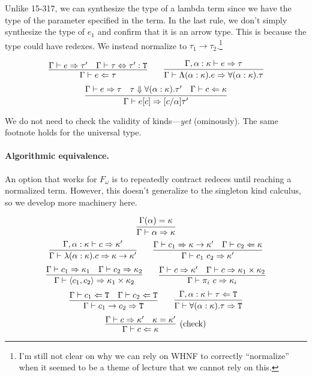 Unlike 15-317, we can synthesize the type of a lambda term since we have the type
of the parameter specified in the term.
In the last rule, we don't simply synthesize the type of $e_1$ and confirm that it
is an arrow type.  This is because the type could have redexes. We instead normalize
to $\tau_1 \rightarrow \tau_2$.\footnote{I'm still not clear on why we can rely on WHNF
to correctly ``normalize'' when it seemed to be a theme of lecture that we cannot rely
on this.}

\begin{judgment}
\[
  \infer
    {\Gamma \vdash e \Leftarrow \tau}
    {\Gamma \vdash e \Rightarrow \tau'
    &\Gamma \vdash \tau \Leftrightarrow \tau' : \T
    }
  \qquad
  \infer
    {\Gamma \vdash \Lambda (\alpha : \kappa).e \Rightarrow \forall (\alpha : \kappa).\tau}
    {\Gamma, \alpha : \kappa \vdash e \Rightarrow \tau}
\]
\[
  \infer
    {\Gamma \vdash e[c] \Rightarrow [c/\alpha]\tau'}
    {\Gamma \vdash e \Rightarrow \tau
    &\tau \Downarrow \forall (\alpha : \kappa).\tau'
    &\Gamma \vdash c \Leftarrow \kappa
    }
\]
\end{judgment}

We do not need to check the validity of kinds---\emph{yet} (ominously). The same footnote
holds for the universal type.

\paragraph{Algorithmic equivalence.} An option that works for $F_\omega$ is to repeatedly
contract redeces until reaching a normalized term. However, this doesn't generalize
to the singleton kind calculus, so we develop more machinery here.

\begin{judgment}
  \[ \infer{\Gamma \vdash \alpha \Rightarrow \kappa}{\Gamma(\alpha) = \kappa} \]
  \[\infer{\Gamma \vdash \lambda (\alpha : \kappa).c \Rightarrow \kappa \rightarrow \kappa'}
         {\Gamma, \alpha : \kappa \vdash c \Rightarrow \kappa'}
   \qquad
   \infer{\Gamma \vdash c_1~c_2 \Rightarrow \kappa'}
         {\Gamma \vdash c_1 \Rightarrow \kappa \rightarrow \kappa'
         &\Gamma \vdash c_2 \Leftarrow \kappa
         }
  \]
  \[
    \infer{\Gamma \vdash \langle c_1, c_2 \rangle \Rightarrow \kappa_1 \times \kappa_2}
      {\Gamma \vdash c_1 \Rightarrow \kappa_1
      &\Gamma \vdash c_2 \Rightarrow \kappa_2
      }
    \qquad
    \infer{\Gamma \vdash \pi_i~c \Rightarrow \kappa_i}
      {\Gamma \vdash c \Rightarrow \kappa'
      &\Gamma \vdash c \Rightarrow \kappa_1 \times \kappa_2
      }
  \]
  \[
    \infer{\Gamma \vdash c_1 \rightarrow c_2 \Rightarrow \T}
      {\Gamma \vdash c_1 \Leftarrow \T
      &\Gamma \vdash c_2 \Leftarrow \T
      }
    \qquad
    \infer{\Gamma \vdash \forall(\alpha : \kappa).\tau \Rightarrow \T}
      {\Gamma, \alpha : \kappa \vdash \tau \Leftarrow \T}
  \]
  \[
    \infer[\text{(check)}]
      {\Gamma \vdash c \Leftarrow \kappa}
      {\Gamma \vdash c \Rightarrow \kappa'
      &\kappa = \kappa'
      }
  \]
\end{judgment}

